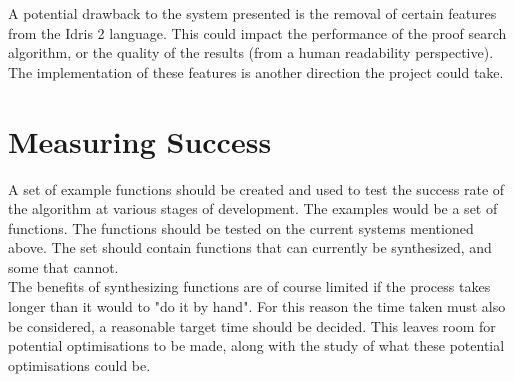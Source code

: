 \documentclass[a4paper]{article}
\begin{document}
A potential drawback to the system presented is the removal of certain features from the Idris 2 language. This could impact the performance of the 
proof search algorithm, or the quality of the results (from a human readability perspective). The implementation of these features is another direction the 
project could take. 

\section{Measuring Success}
\label{sec:org113cf6c}

A set of example functions should be created and used to test the success rate of the algorithm at various stages of development. The examples would
be a set of functions. The functions should be tested on the current systems mentioned above. The set should contain functions that can currently be synthesized,
and some that cannot.\\

The benefits of synthesizing functions are of course limited if the process takes longer than it would to "do it by hand". For this reason the 
time taken must also be considered, a reasonable target time should be decided. This leaves room for potential optimisations to be made, along with 
the study of what these potential optimisations could be.   
\end{document}
